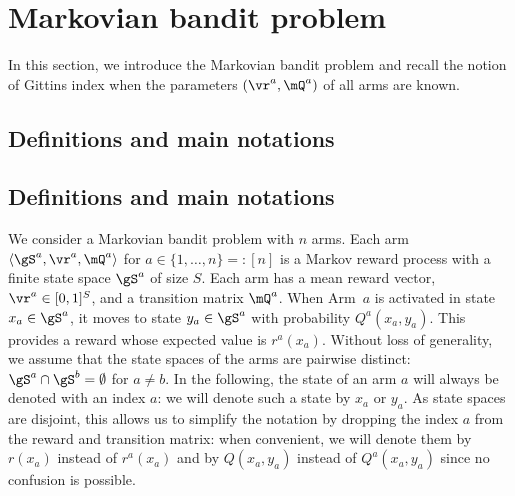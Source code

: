 \section{Markovian bandit problem}
\label{sec:bandits}

In this section, we introduce the Markovian bandit problem and recall the notion of Gittins index when the parameters $(\vr^a,\mQ^a)$ of all arms are known. 

\subsection{Definitions and main notations}
\label{ssec:def}

\subsection{Definitions and main notations}
\label{ssec:def}

We consider a Markovian bandit problem with $n$ arms. Each arm
$\langle\gS^a,\vr^a,\mQ^a\rangle$ for $a\in\{1,\dots, n\}=:[n]$ is a Markov
reward process with a finite state space $\gS^a$ of size $S$. Each arm has
a mean reward vector, $\vr^a\in[0,1]^S$, and a transition matrix
$\mQ^a$.  When Arm~$a$ is activated in state $x_a\in\gS^a$, it moves to
state $y_a\in\gS^a$ with probability $Q^a(x_a,y_a)$.  This provides a reward
whose expected value is $r^a(x_a)$.  Without loss of generality, we assume
that the state spaces of the arms are pairwise distinct:
$\gS^a\cap\gS^b=\emptyset$ for $a\ne b$.  In the following, the state of an
arm $a$ will always be denoted with an index $a$: we will denote such a
state by $x_a$ or $y_a$.  As state spaces are disjoint, this allows us to
simplify the notation by dropping the index $a$ from the reward and transition
matrix: when convenient, we will denote them by $r(x_a)$ instead of $r^a(x_a)$
and by $Q(x_a,y_a)$ instead of $Q^a(x_a,y_a)$ since no confusion is possible. 

